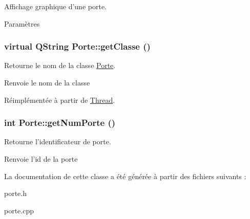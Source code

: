 Affichage graphique d'une porte. 


\begin{DoxyParams}{Paramètres}
\item[{\em }]\end{DoxyParams}
\hypertarget{classPorte_a773001136f190566b51b4e24c4323409}{
\subsubsection[{getClasse}]{\setlength{\rightskip}{0pt plus 5cm}virtual QString Porte::getClasse ()}}
\label{classPorte_a773001136f190566b51b4e24c4323409}


Retourne le nom de la classe \hyperlink{classPorte}{Porte}. 

\begin{DoxyReturn}{Renvoie}
le nom de la classe 
\end{DoxyReturn}


Réimplémentée à partir de \hyperlink{classThread_ad055e7c603fda2607670f69c32b2d98a}{Thread}.

\hypertarget{classPorte_a65ae951c733e2741c6dcc5ef336ff7d4}{
\subsubsection[{getNumPorte}]{\setlength{\rightskip}{0pt plus 5cm}int Porte::getNumPorte ()}}
\label{classPorte_a65ae951c733e2741c6dcc5ef336ff7d4}


Retourne l'identificateur de porte. 

\begin{DoxyReturn}{Renvoie}
l'id de la porte 
\end{DoxyReturn}


La documentation de cette classe a été générée à partir des fichiers suivants :\begin{DoxyCompactItemize}
\item 
porte.h\item 
porte.cpp\end{DoxyCompactItemize}
